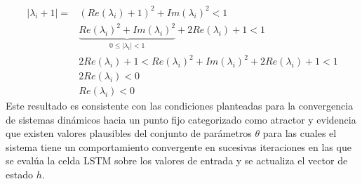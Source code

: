 \documentclass{article}
\begin{document}
	\begin{equation*}
	\begin{split}
	|\lambda_i + 1| = &(Re(\lambda_i) + 1)^2 + Im(\lambda_i)^2 < 1\\
	& \underbrace{Re(\lambda_i)^2 + Im(\lambda_i)^2}_{0 \le |\lambda_i| < 1} + 2Re(\lambda_i) + 1  < 1\\
	& 2Re(\lambda_i) + 1  < Re(\lambda_i)^2 + Im(\lambda_i)^2 + 2Re(\lambda_i) + 1 < 1\\
	& 2Re(\lambda_i) < 0\\
	& Re(\lambda_i) < 0
	\end{split}
	\end{equation*}
	Este resultado es consistente con las condiciones planteadas para la convergencia de sistemas dinámicos hacia un punto fijo categorizado como atractor y evidencia que existen valores plausibles del conjunto de parámetros $\theta$ para las cuales el sistema tiene un comportamiento convergente en sucesivas iteraciones en las que se evalúa la celda LSTM sobre los valores de entrada y se actualiza el vector de estado $h$.
	
\end{document}
